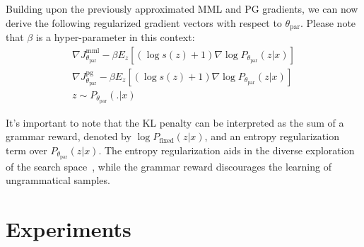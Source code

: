 \documentclass[11pt]{article}
\begin{document}
Building upon the previously approximated MML and PG gradients, we can now derive the following regularized gradient vectors with respect to $\theta_{\text{par}}$. Please note that $\beta$ is a hyper-parameter in this context:
\begin{multline}
\nabla J^{\text{mml}}_{\theta_{\text{par}}} - \beta E_{z} [(\log s(z) + 1) \nabla \log P_{\theta_{\text{par}}} (z | x)] \\
\nabla J^{\text{pg}}_{\theta_{\text{par}}} - \beta E_{z} [(\log s(z) + 1) \nabla \log P_{\theta_{\text{par}}} (z | x)] \\
z \sim P_{\theta_{\text{par}}}(.|x)
\label{lmfp-expect-ppo-gradient}
\end{multline}

It's important to note that the KL penalty can be interpreted as the sum of a grammar reward, denoted by $\log P_{\text{fixed}}(z|x)$, and an entropy regularization term over $P_{\theta_{\text{par}}} (z | x)$. The entropy regularization aids in the diverse exploration of the search space~\cite{DBLP:journals/corr/MnihBMGLHSK16}, while the grammar reward discourages the learning of ungrammatical samples.

\begin{comment}
\subsection{Ensemble Inference}
\label{ensemble-inference}
After optimizing Equation \ref{lmfp-main-objective} and fine-tuning our paraphrase generator, we generate weakly-supervised examples for inclusion in the objective \ref{lmfp-augmentation-objective} to train our downstream language model.

To predict the label of a test example, we could either use our fine-tuned language model to predict the class based on the original input $x$, or adopt an ensembling approach. For the latter, for a given $x$, we generate $M$ paraphrases using our fine-tuned paraphrase generator. We then average the prediction scores for a potential class across the $M+1$ values to predict the class for that input example $x$. This aligns with our earlier assumption that some paraphrases could be easier for the language model to predict the correct label.
\end{comment}

\section{Experiments}
\end{document}
